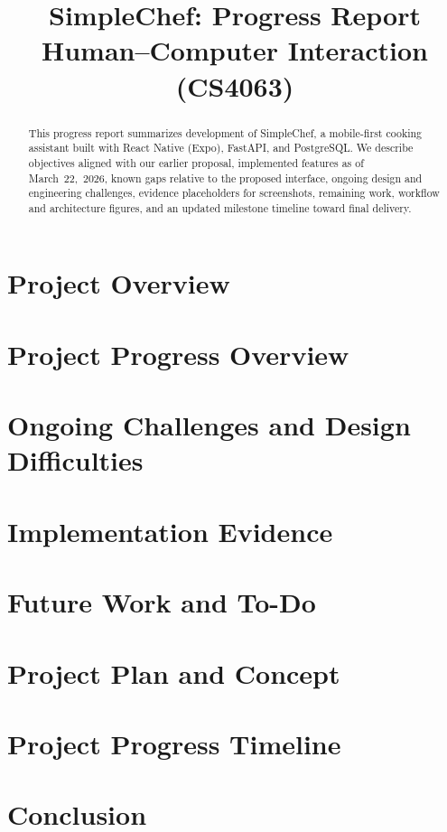 \documentclass[conference]{IEEEtran}
\title{SimpleChef: Progress Report\\Human--Computer Interaction (CS4063)}
\author{%
\IEEEauthorblockN{[Group Name]}
\IEEEauthorblockA{[Institution / Course Section]\\
Email: [contact email]}}
\begin{document}
\maketitle

\begin{abstract}
This progress report summarizes development of SimpleChef, a mobile-first cooking assistant built with React Native (Expo), FastAPI, and PostgreSQL. We describe objectives aligned with our earlier proposal, implemented features as of March~22,~2026, known gaps relative to the proposed interface, ongoing design and engineering challenges, evidence placeholders for screenshots, remaining work, workflow and architecture figures, and an updated milestone timeline toward final delivery.
\end{abstract}

\section{Project Overview}


\section{Project Progress Overview}


\section{Ongoing Challenges and Design Difficulties}


\section{Implementation Evidence}


\section{Future Work and To-Do}


\section{Project Plan and Concept}


\section{Project Progress Timeline}


\section{Conclusion}




\end{document}
